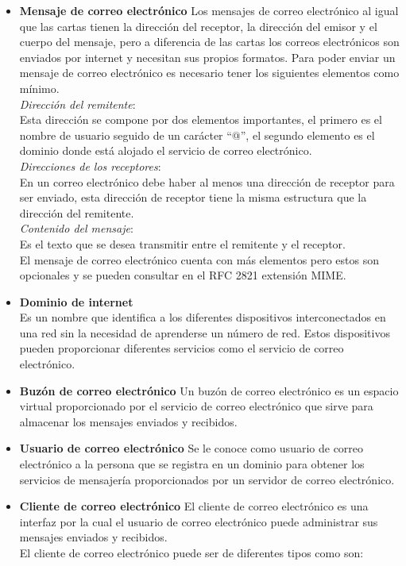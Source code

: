 \documentclass[12pt,oneside,onecolumn,openany]{report}
\begin{document}
\begin{itemize}
\item \textbf{Mensaje de correo electrónico}
Los  mensajes  de  correo  electrónico  al  igual  que  las  cartas  tienen  la  dirección  del receptor, la dirección del emisor y el cuerpo del mensaje, pero a diferencia de las cartas 
los correos electrónicos son enviados por internet y necesitan sus propios formatos. Para  poder  enviar  un  mensaje  de  correo  electrónico  es  necesario  tener  los siguientes  elementos 
como mínimo.\\ 
\textit{Dirección  del  remitente}:\\  Esta  dirección  se  compone  por  dos  elementos  importantes,  el primero es el nombre de usuario seguido de un carácter “@”, el segundo elemento es 
el dominio donde está alojado el servicio de correo electrónico.\\ 
\textit{Direcciones  de  los  receptores}:\\  En  un  correo  electrónico  debe  haber  al  menos  una dirección  de  receptor  para  ser  enviado,  esta  dirección  de  receptor  tiene  la  misma 
estructura que la dirección del remitente.     \\  
\textit{Contenido  del  mensaje}:\\  Es  el  texto  que  se  desea  transmitir entre  el  remitente  y  el receptor. \\ 
El mensaje de correo electrónico cuenta con más elementos pero estos son opcionales y se pueden consultar en el RFC 2821 extensión MIME. 
\item \textbf{Dominio de internet}\\
Es un nombre que identifica a los diferentes dispositivos interconectados en una red sin la  necesidad  de  aprenderse  un  número  de  red.  Estos  dispositivos  pueden  proporcionar 
diferentes servicios como el servicio de correo electrónico. 
\item \textbf{Buzón de correo electrónico}
Un  buzón  de  correo  electrónico  es  un  espacio  virtual  proporcionado  por  el  servicio  de correo electrónico que sirve para almacenar los mensajes enviados y recibidos. 
\item \textbf{Usuario de correo electrónico}
Se  le  conoce  como  usuario  de  correo  electrónico  a  la  persona  que  se  registra  en  un dominio  para  obtener  los  servicios  de  mensajería  proporcionados  por  un  servidor  de correo electrónico. 
\item \textbf{Cliente de correo electrónico}
El  cliente  de  correo  electrónico  es  una  interfaz  por  la  cual  el  usuario  de  correo  electrónico puede administrar sus mensajes enviados y recibidos. \\
El cliente de correo electrónico puede ser de diferentes tipos como son: 


\end{itemize}
\end{document}
